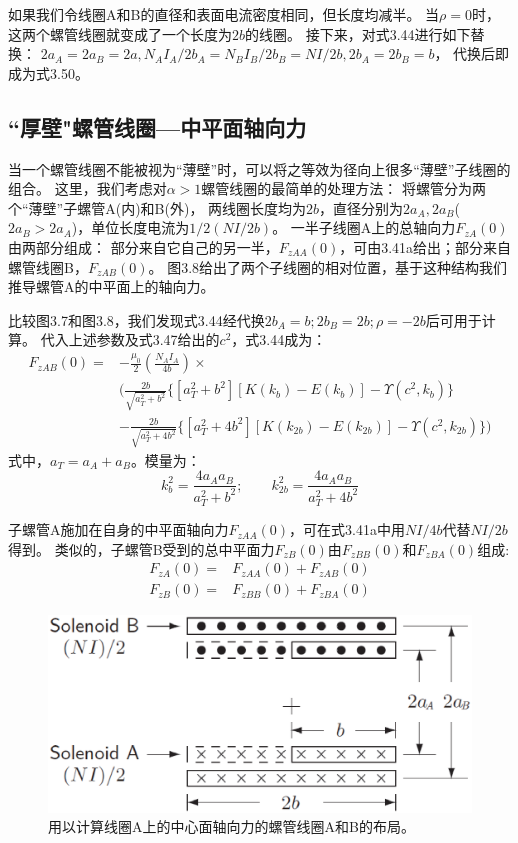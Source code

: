 如果我们令线圈A和B的直径和表面电流密度相同，但长度均减半。
当$\rho=0$时，这两个螺管线圈就变成了一个长度为$2b$的线圈。
接下来，对式3.44进行如下替换：
$2a_A=2a_B=2a, N_A I_A/2b_A = N_B I_B/2b_B = NI/2b,2b_A = 2b_B = b$，
代换后即成为式3.50。

\subsection{``厚壁"螺管线圈---中平面轴向力}
当一个螺管线圈不能被视为``薄壁''时，可以将之等效为径向上很多``薄壁''子线圈的组合。
这里，我们考虑对$\alpha>1$螺管线圈的最简单的处理方法：
将螺管分为两个``薄壁''子螺管A(内)和B(外)，
两线圈长度均为$2b$，直径分别为$2a_A,2a_B$($2a_B >2a_A$)，单位长度电流为$1/2(NI/2b)$。
一半子线圈A上的总轴向力$F_{zA}(0)$由两部分组成：
部分来自它自己的另一半，$F_{zAA}(0)$，可由3.41a给出；部分来自螺管线圈B，$F_{zAB}(0)$。
图3.8给出了两个子线圈的相对位置，基于这种结构我们推导螺管A的中平面上的轴向力。

比较图3.7和图3.8，我们发现式3.44经代换$2b_A = b; 2b_B = 2b; \rho = −2b$后可用于计算。
代入上述参数及式3.47给出的$c^2$，式3.44成为：
\begin{equation}
\begin{split}
F_{zAB}(0)=&-\frac{\mu_0}{2}(\frac{N_A I_A}{4b})\times \\
&\bigg(\frac{2b}{\sqrt{a_T^2+b^2}} \{[a_T^2+b^2][K(k_{b})-E(k_{b})]-\Upsilon(c^2,k_b)\}\\
&-\frac{2b}{\sqrt{a_T^2+4b^2}} \{[a_T^2+4b^2][K(k_{2b})-E(k_{2b})]-\Upsilon(c^2,k_{2b}) \}\bigg)
\end{split}
\end{equation}
式中，$a_T=a_A+a_B$。模量为：
$$k_{b}^2=\frac{4a_A a_B}{a_T^2+b^2} ;\qquad k_{2b}^2=\frac{4a_A a_B}{a_T^2+4b^2} $$

子螺管A施加在自身的中平面轴向力$F_{zAA}(0)$，可在式3.41a中用$NI/4b$代替$NI/2b$得到。
类似的，子螺管B受到的总中平面力$F_{zB}(0)$由$F_{zBB}(0)$和$F_{zBA}(0)$组成:
\begin{subequations}
	\begin{align}
F_{zA}(0) =& F_{zAA}(0)+F_{zAB}(0) \\
F_{zB}(0) =& F_{zBB}(0)+F_{zBA}(0)
	\end{align}
\end{subequations}

\begin{figure}[htbp]
  \centering
 \includegraphics[scale=0.4]{chpt3/figs/fig3.8.eps}
  \caption{用以计算线圈A上的中心面轴向力的螺管线圈A和B的布局。}
\end{figure}

